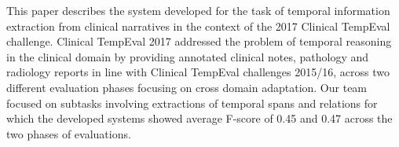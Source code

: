 This paper describes the system developed for the task of temporal information extraction from clinical narratives in the context of the 2017 Clinical TempEval challenge. Clinical TempEval 2017 addressed the problem of temporal reasoning in the clinical domain by providing annotated clinical notes, pathology and radiology reports in line with Clinical TempEval challenges 2015/16, across two different evaluation phases focusing on cross domain adaptation. Our team focused on subtasks involving extractions of temporal spans and relations for which the developed systems showed average F-score of 0.45 and 0.47 across the two phases of evaluations.
